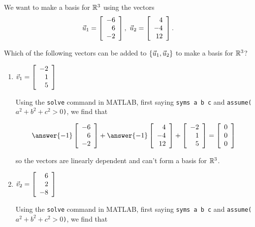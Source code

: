 \documentclass{ximera}
\author{Zack Reed}
\begin{document}
\begin{exercise}

    We want to make a basis for $\R^3$ using the vectors
    \begin{equation*}
      \vect{u}_1 = \startmat{r} -6 \\ 6 \\ -2\stopmat,\quad
      \vect{u}_2 =\startmat{r} 4 \\ -4 \\ 12\stopmat.
    \end{equation*}

    Which of the following vectors can be added to $\set{\vect{u}_1,\vect{u}_2}$ to make a basis for $\R^3$?

    \begin{enumerate}
    \item $\vect{v}_1 = \startmat{r} -2 \\ 1 \\ 5\stopmat$ 
    \begin{problem}

        Using the \texttt{solve} command in MATLAB, first saying \texttt{syms a b c} and \texttt{assume($a^2+b^2+c^2>0$)}, we find that

        \begin{equation*}
        \answer{-1}\startmat{r} -6 \\ 6 \\ -2\stopmat + \answer{-1}\startmat{r} 4 \\ -4 \\ 12\stopmat + \startmat{r} -2 \\ 1 \\ 5\stopmat = \startmat{r} 0 \\ 0 \\ 0\stopmat
        \end{equation*}

        so the vectors are linearly dependent and can't form a basis for $\R^3$.

    \end{problem}
    \item $\vect{v}_2 = \startmat{r} 6 \\ 2 \\ -8\stopmat$
    
    \begin{problem}
        
        Using the \texttt{solve} command in MATLAB, first saying \texttt{syms a b c} and \texttt{assume($a^2+b^2+c^2>0$)}, we find that


\end{problem}
\end{enumerate}
\end{exercise}
\end{document}
